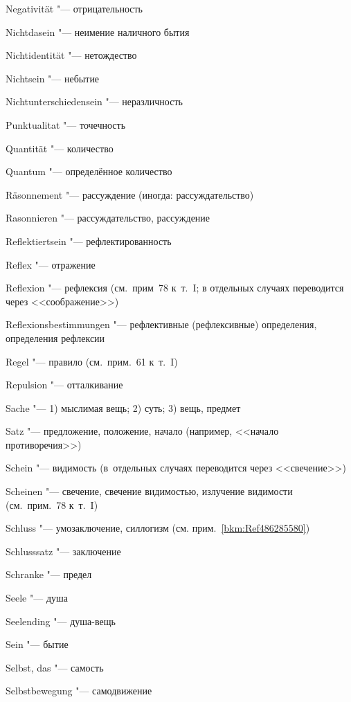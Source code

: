 \begin{multicols}{2}
Nega\-tivi\-tät "--- отрицательность

Nicht\-da\-sein "--- неимение наличного бытия

Nicht\-iden\-tität "--- нетождество

Nicht\-sein "--- небытие

Nicht\-unter\-schieden\-sein "--- неразличность

\bigskip

Punktu\-ali\-tat "--- точечность

\bigskip

Quantität "--- количество

Quantum "--- определённое количество

\bigskip

Räson\-nement "--- рассуждение (иногда: рассуждательство)

Rason\-nieren "--- рассуждательство, рассуждение

Reflek\-tiertsein "--- рефлектированность

Reflex "--- отражение

Reflexion "--- рефлексия (см.~прим~78 к~т.~I; в отдельных случаях
переводится через <<соображение>>)

Re\-flexions\-bestim\-mungen "--- рефлективные (рефлексивные)
определения, определения рефлексии

Regel "--- правило (см.~прим.~61 к~т.~I)

Repul\-sion "--- отталкивание

\bigskip

Sache "--- 1) мыслимая вещь; 2) суть; 3) вещь, предмет

Satz "--- предложение, положение, начало (например, <<начало противоречия>>)

Schein "--- видимость (в~отдельных случаях переводится через <<свечение>>)

Scheinen "--- свечение, свечение видимостью, излучение видимости
(см.~прим.~78 к~т.~I)

Schluss "--- умозаключение, силлогизм (см. прим.~\ref{bkm:Ref486285580})

Schluss\-satz "--- заключение

Schranke "--- предел

Seele "--- душа

Seelending "--- душа-вещь

Sein "--- бытие

Selbst, das "--- самость

Selbst\-bewegung "--- самодвижение


\end{multicols}
